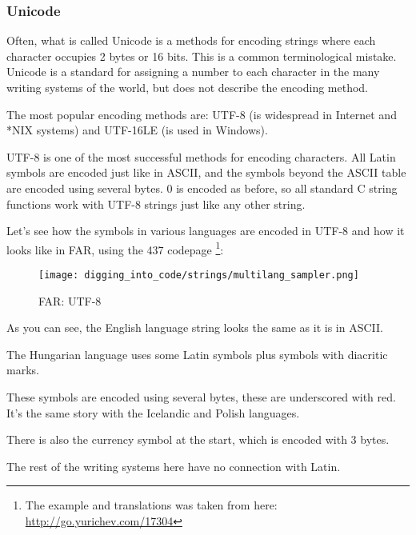 \subsubsection{Unicode}


Often, what is called Unicode is a methods for encoding strings where each character occupies 2 bytes or 16 bits.
This is a common terminological mistake.
Unicode is a standard for assigning a number to each character in the many writing systems of the 
world, but does not describe the encoding method.

The most popular encoding methods are: UTF-8 (is widespread in Internet and *NIX systems) and UTF-16LE (is used in Windows).


UTF-8 is one of the most successful methods for
encoding characters.
All Latin symbols are encoded just like in ASCII,
and the symbols beyond the ASCII table are encoded using several bytes.
0 is encoded as
before, so all standard C string functions work with UTF-8 strings just like any other string.

Let's see how the symbols in various languages are encoded in UTF-8 and how it looks like in FAR, using the 437 codepage
\footnote{The example and translations was taken from here: 
\url{http://go.yurichev.com/17304}}:

\begin{figure}[H]
\centering
\texttt{[image: digging\_into\_code/strings/multilang\_sampler.png]}
\end{figure}

\begin{figure}[H]
\centering
{}
\caption{FAR: UTF-8}
\end{figure}

As you can see, the English language string looks the same as it is in ASCII.

The Hungarian language uses some Latin symbols plus symbols with diacritic marks.

These symbols are encoded using several bytes, these are underscored with red.
It's the same story with the Icelandic and Polish languages.

There is also the  currency symbol at the start, which is encoded with 3 bytes.

The rest of the writing systems here have no connection with Latin.

